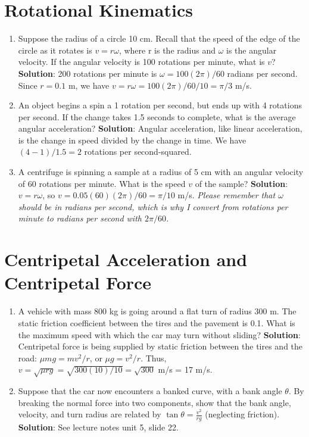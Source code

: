 \documentclass[10pt]{article}
\begin{document}
\maketitle

\section{Rotational Kinematics}
\begin{enumerate}
\item Suppose the radius of a circle 10 cm.  Recall that the speed of the edge of the circle as it rotates is $v = r\omega$, where r is the radius and $\omega$ is the angular velocity.  If the angular velocity is 100 rotations per minute, what is $v$?
\textbf{Solution}: 200 rotations per minute is $\omega = 100(2\pi)/60$ radians per second.  Since $r = 0.1$ m, we have $v = r\omega = 100(2\pi)/60/10 = \pi/3$ m/s.
\item An object begins a spin a 1 rotation per second, but ends up with 4 rotations per second.  If the change takes 1.5 seconds to complete, what is the average angular acceleration? \textbf{Solution}: Angular acceleration, like linear acceleration, is the change in speed divided by the change in time.  We have $(4-1)/1.5 = 2$ rotations per second-squared.
\item A centrifuge is spinning a sample at a radius of 5 cm with an angular velocity of 60 rotations per minute.  What is the speed $v$ of the sample?  \textbf{Solution}: $v = r\omega$, so $v = 0.05(60)(2\pi)/60 = \pi/10$ m/s. \textit{Please remember that $\omega$ should be in radians per second, which is why I convert from rotations per minute to radians per second with $2\pi/60$.}
\end{enumerate}
\section{Centripetal Acceleration and Centripetal Force}
\begin{enumerate}
\item A vehicle with mass 800 kg is going around a flat turn of radius 300 m.  The static friction coefficient between the tires and the pavement is 0.1.  What is the maximum speed with which the car may turn without sliding?  \textbf{Solution}: Centripetal force is being supplied by static friction between the tires and the road: $\mu m g = mv^2/r$, or $\mu g = v^2/r$.  Thus, $v = \sqrt{\mu rg} = \sqrt{300(10)/10} = \sqrt{300}$ m/s = 17 m/s.
\item Suppose that the car now encounters a banked curve, with a bank angle $\theta$.  By breaking the normal force into two components, show that the bank angle, velocity, and turn radius are related by $\tan\theta = \frac{v^2}{rg}$ (neglecting friction). \textbf{Solution}: See lecture notes unit 5, slide 22.
\end{enumerate}
\end{document}
